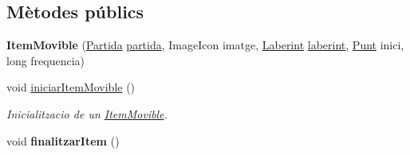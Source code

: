 \subsection*{Mètodes públics}
\begin{DoxyCompactItemize}
\item 
\hypertarget{classlogica_1_1_item_movible_a0463ef4d0a9e8e652be4a19b8dfba67c}{{\bfseries Item\+Movible} (\hyperlink{classlogica_1_1_partida}{Partida} \hyperlink{classlogica_1_1_item_movible_ace55b4918a7f671f89ed3109c91359e4}{partida}, Image\+Icon imatge, \hyperlink{classlogica_1_1laberints_1_1_laberint}{Laberint} \hyperlink{classlogica_1_1_item_movible_a97036130b7376d77776427ca126f6fb5}{laberint}, \hyperlink{classlogica_1_1_punt}{Punt} inici, long frequencia)}\label{classlogica_1_1_item_movible_a0463ef4d0a9e8e652be4a19b8dfba67c}

\item 
void \hyperlink{classlogica_1_1_item_movible_a9a43835d32363d837ad38635e48483ba}{iniciar\+Item\+Movible} ()
\begin{DoxyCompactList}\small\item\em Inicialitzacio de un \hyperlink{classlogica_1_1_item_movible}{Item\+Movible}. \end{DoxyCompactList}\item 
\hypertarget{classlogica_1_1_item_movible_a3362abf376e2d3fcf4b0690954e8c933}{void {\bfseries finalitzar\+Item} ()}\label{classlogica_1_1_item_movible_a3362abf376e2d3fcf4b0690954e8c933}


\end{DoxyCompactItemize}
